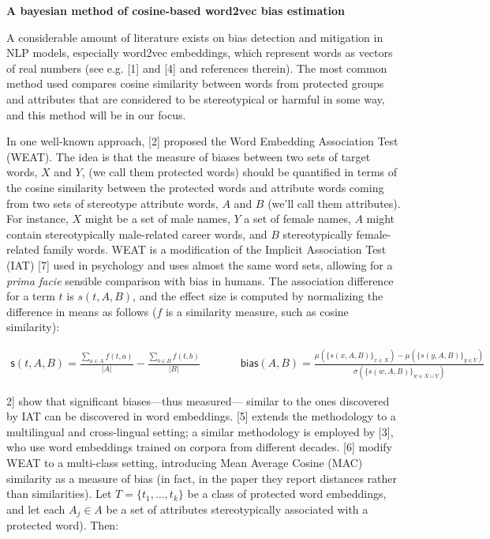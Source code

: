 \documentclass[12pt,dvipsnames,enabledeprecatedfontcommands]{scrartcl}
\author{}
\date{\vspace{-2.5em}}
\begin{document}
\begin{center}
\Large \textbf{A bayesian method of cosine-based word2vec bias estimation}
\end{center}

\vspace{1mm}

A considerable amount of literature exists on bias detection and
mitigation in NLP models, especially word2vec embeddings, which
represent words as vectors of real numbers (see e.g. {[}1{]} and {[}4{]}
and references therein). The most common method used compares cosine
similarity between words from protected groups and attributes that are
considered to be stereotypical or harmful in some way, and this method
will be in our focus.

In one well-known approach, {[}2{]} proposed the Word Embedding
Association Test (WEAT). The idea is that the measure of biases between
two sets of target words, \(X\) and \(Y\), (we call them protected
words) should be quantified in terms of the cosine similarity between
the protected words and attribute words coming from two sets of
stereotype attribute words, \(A\) and \(B\) (we'll call them
attributes). For instance, \(X\) might be a set of male names, \(Y\) a
set of female names, \(A\) might contain stereotypically male-related
career words, and \(B\) stereotypically female-related family words.
WEAT is a modification of the Implicit Association Test (IAT) {[}7{]}
used in psychology and uses almost the same word sets, allowing for a
\emph{prima facie} sensible comparison with bias in humans. The
association difference for a term \(t\) is \(s(t,A,B)\), and the effect
size is computed by normalizing the difference in means as follows
(\(f\) is a similarity measure, such as cosine similarity):

\vspace{-3mm}

\footnotesize 

\begin{align}
\mathsf{s}(t,A,B)  = \frac{\sum_{a\in A}f(t,a)}{\vert A\vert} - \frac{\sum_{b\in B}f(t,b)}{\vert B\vert}
& \,\,\,\,\,\,\,\,\,\,\,\,\,\,\,\,\,
\mathsf{bias}(A,B)  = \frac{
\mu(\{s(x,A,B)\}_{x\in X}) -\mu(\{s(y,A,B)\}_{y\in Y}) 
}{
\sigma(\{s(w,A,B)\}_{w\in X\cup Y})
} \tag{WEAT}
\end{align}

\normalsize
\noindent {[}2{]} show that significant biases---thus measured---
similar to the ones discovered by IAT can be discovered in word
embeddings. {[}5{]} extends the methodology to a multilingual and
cross-lingual setting; a similar methodology is employed by {[}3{]}, who
use word embeddings trained on corpora from different decades. {[}6{]}
modify WEAT to a multi-class setting, introducing Mean Average Cosine
(MAC) similarity as a measure of bias (in fact, in the paper they report
distances rather than similarities). Let \(T = \{t_1, \dots, t_k\}\) be
a class of protected word embeddings, and let each \(A_j\in A\) be a set
of attributes stereotypically associated with a protected word). Then:
\end{document}
